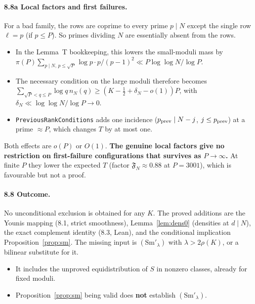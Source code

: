 \documentclass[11pt,a4paper]{article}
\theoremstyle{remark}
\begin{document}
\paragraph{8.8a Local factors and first failures.}
For a bad family, the rows are coprime to every prime $p\mid N$ except the single row $\ell=p$ (if $p\le P$). So primes
dividing $N$ are essentially absent from the rows.
\begin{itemize}
\item In the Lemma~T bookkeeping, this lowers the small-moduli mass by
$\pi(P)\sum_{p\mid N,\,p\le\sqrt P}\log p\cdot p/(p-1)^2\ll P\log\log N/\log P$.
\item The necessary condition on the large moduli therefore becomes
$\sum_{\sqrt P<q\le P}\log q\,n_N(q)\ge(K-\frac12+\delta_N-o(1))P$, with $\delta_N\ll\log\log N/\log P\to0$.
\item \texttt{PreviousRankConditions} adds one incidence ($p_{\rm prev}\mid N-j$, $j\le p_{\rm prev}$) at a prime $\approx P$, which changes
$T$ by at most one.
\end{itemize}
Both effects are $o(P)$ or $O(1)$. \textbf{The genuine local factors give no restriction on first-failure configurations that
survives as $P\to\infty$.} At finite $P$ they lower the expected $T$ (factor $\mathfrak F_N\approx0.88$ at $P=3001$), which is
favourable but not a proof.

\paragraph{8.8 Outcome.} No unconditional exclusion is obtained for any $K$. The proved additions are the
Younis mapping (8.1, strict smoothness), Lemma~\ref{lem:dens0} (densities at $d\mid N$), the exact complement identity
(8.3, Lean), and the conditional implication Proposition~\ref{prop:sm}. The missing input is $(\mathrm{Sm}'_\lambda)$ with
$\lambda>2\rho(K)$, or a bilinear substitute for it.
\begin{itemize}
\item It includes the unproved equidistribution of $S$ in nonzero classes, already for fixed moduli.
\item Proposition~\ref{prop:sm} being valid does \textbf{not} establish $(\mathrm{Sm}'_\lambda)$.
\end{itemize}
\end{document}

